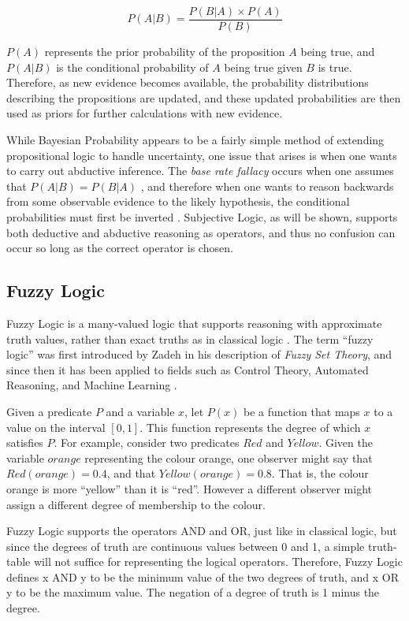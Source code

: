 \documentclass[thesis.tex]{subfiles}
\begin{document}
$$
P(A | B) = \frac{P(B | A) \times P(A)}{P(B)}
$$

$P(A)$ represents the prior probability of the proposition $A$ being true, and $P(A | B)$
is the conditional probability of $A$ being true given $B$ is true. Therefore, as new evidence becomes
available, the probability distributions describing the propositions are updated, and these
updated probabilities are then used as priors for further calculations with new evidence.

While Bayesian Probability appears to be a fairly simple method of extending propositional
logic to handle uncertainty, one issue that arises is when one wants to carry out
abductive inference. The \emph{base rate fallacy} occurs when one assumes that
$P(A | B) = P(B | A)$ \cite{koehler1996base}, and therefore when one wants to reason backwards from
some observable evidence to the likely hypothesis, the conditional probabilities must
first be inverted \cite{josanginverting}. Subjective Logic, as will be shown, supports both deductive and
abductive reasoning as operators, and thus no confusion can occur so long as the correct
operator is chosen.





\subsection{Fuzzy Logic}

Fuzzy Logic is a many-valued logic that supports reasoning with approximate
truth values, rather than exact truths as in classical logic \cite{perfilieva1999mathematical}.
The term ``fuzzy logic'' was first introduced by Zadeh \cite{zadeh1965fuzzy} in his description
of \emph{Fuzzy Set Theory}, and since then it has been applied to fields such as
Control Theory, Automated Reasoning, and Machine Learning \cite{bansod2005soft}.

Given a predicate $P$ and a variable $x$, let $P(x)$ be a function that maps
$x$ to a value on the interval $[0, 1]$. This function represents the degree of which
$x$ satisfies $P$. For example, consider two predicates $Red$ and $Yellow$. Given
the variable $orange$ representing the colour orange, one observer might say that
$Red(orange) = 0.4$, and that $Yellow(orange) = 0.8$. That is, the colour orange
is more ``yellow'' than it is ``red''. However a different observer might assign
a different degree of membership to the colour.

Fuzzy Logic supports the operators AND and OR, just like in classical logic, but since
the degrees of truth are continuous values between 0 and 1, a simple truth-table will
not suffice for representing the logical operators. Therefore, Fuzzy Logic defines
x AND y to be the minimum value of the two degrees of truth, and x OR y to be the
maximum value. The negation of a degree of truth is 1 minus the degree.
\end{document}
